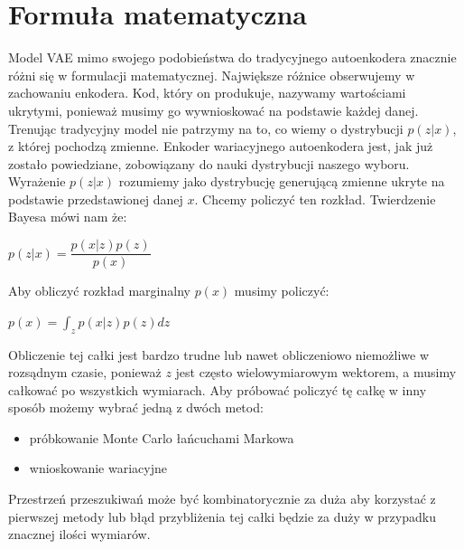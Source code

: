 \documentclass[a4paper,12pt]{book} %
\begin{document}
\section{Formuła matematyczna}
Model VAE mimo swojego podobieństwa do tradycyjnego autoenkodera znacznie różni się w formulacji matematycznej. Największe różnice obserwujemy w zachowaniu enkodera. Kod, który on produkuje, nazywamy wartościami ukrytymi, ponieważ musimy go wywnioskować na podstawie każdej danej. Trenując tradycyjny model nie patrzymy na to, co wiemy o dystrybucji $p(z|x)$, z której pochodzą zmienne. Enkoder wariacyjnego autoenkodera jest, jak już zostało powiedziane, zobowiązany do nauki dystrybucji naszego wyboru. Wyrażenie $p(z|x)$ rozumiemy jako dystrybucję generującą zmienne ukryte na podstawie przedstawionej danej $x$. Chcemy policzyć ten rozkład. Twierdzenie Bayesa mówi nam że:
\begin{center}
	$p(z|x)=\dfrac{p(x|z)p(z)}{p(x)}$
\end{center}
Aby obliczyć rozkład marginalny $p(x)$ musimy policzyć:
\begin{center}
	$p(x) = \displaystyle\int_{z}^{}p(x|z)p(z)dz$
\end{center}
Obliczenie tej całki jest bardzo trudne lub nawet obliczeniowo niemożliwe w rozsądnym czasie, ponieważ $z$ jest często wielowymiarowym wektorem, a musimy całkować po wszystkich wymiarach. Aby próbować policzyć tę całkę w inny sposób możemy wybrać jedną z dwóch metod:
\begin{itemize}
	\item próbkowanie Monte Carlo łańcuchami Markowa
	\item wnioskowanie wariacyjne
\end{itemize}
Przestrzeń przeszukiwań może być kombinatorycznie za duża aby korzystać z pierwszej metody lub błąd przybliżenia tej całki będzie za duży w przypadku znacznej ilości wymiarów.
\end{document}
